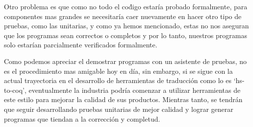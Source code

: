 Otro problema es que como no todo el co\'digo estaría probado formalmente, para componentes mas grandes se necesitaría caer 
nuevamente en hacer otro tipo de pruebas, como las unitarias, y como ya hemos mencionado, estas no nos aseguran que los 
programas sean correctos o completos y por lo tanto, nuestros programas solo estarían parcialmente verificados formalmente.

Como podemos apreciar el demostrar programas con un asistente de pruebas, no es el procedimiento mas amigable hoy en día, 
sin embargo, si se sigue con la actual trayectoria en el desarrollo de herramientas de traducci\'on como lo es `hs-to-coq', eventualmente la industria podría comenzar a utilizar herramientas de este estilo para mejorar la calidad de sus productos. Mientras tanto, se tendrán que seguir desarrollando pruebas unitarias de mejor calidad y lograr generar programas que tiendan a la correcci\'on y completud.
